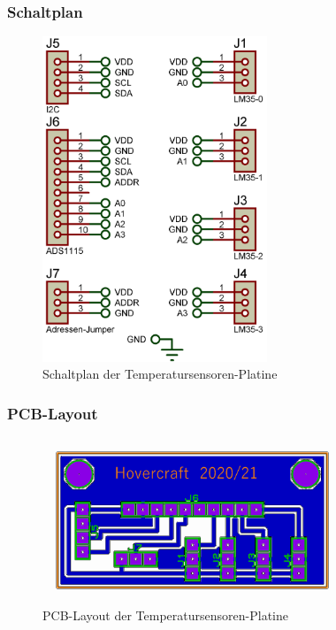 \subsubsection{Schaltplan}
\begin{figure}[h]
    \centering
    \includegraphics[width=0.6\textwidth]{../Proteus/Exports/Temperatursensoren-Platine.png}    
    \caption{Schaltplan der Temperatursensoren-Platine}
\end{figure}

\newpage

\subsubsection{PCB-Layout}
\begin{figure}[h]
    \centering
    \includegraphics[width=0.8\textwidth]{../Proteus/Exports/Temperatursensoren-Platine-PCB.png}    
    \caption{PCB-Layout der Temperatursensoren-Platine}
\end{figure}

